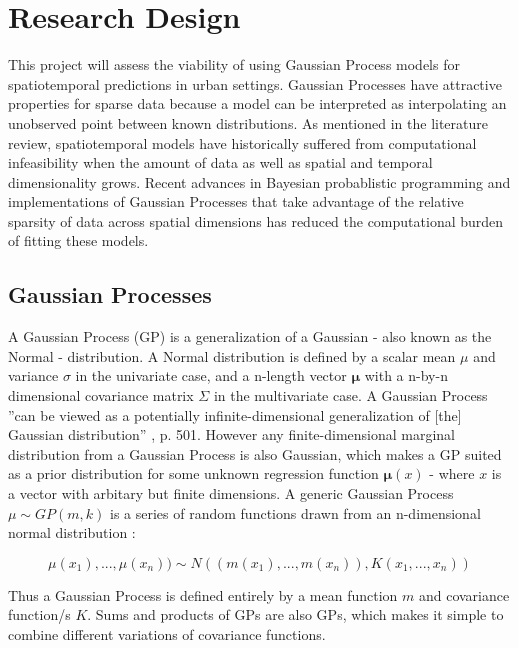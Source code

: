 
\chapter{Research Design}
\label{design}


This project will assess the viability of using Gaussian Process models for spatiotemporal predictions in urban settings. Gaussian Processes have attractive properties for sparse data because a model can be interpreted as interpolating an unobserved point between known distributions. As mentioned in the literature review, spatiotemporal models have historically suffered from computational infeasibility when the amount of data as well as spatial and temporal dimensionality grows. Recent advances in Bayesian probablistic programming and implementations of Gaussian Processes that take advantage of the relative sparsity of data across spatial dimensions has reduced the computational burden of fitting these models. \par


\section{Gaussian Processes}

A Gaussian Process (GP) is a generalization of a Gaussian - also known as the Normal - distribution. A Normal distribution is defined by a scalar mean $\mu$ and variance $\sigma$ in the univariate case, and a n-length vector $\mathbf{\mu}$ with a n-by-n dimensional covariance matrix $\Sigma$ in the multivariate case. A Gaussian Process ''can be viewed as a potentially infinite-dimensional generalization of [the] Gaussian distribution'' \cite{gelman2013bayesian} , p. 501. However any finite-dimensional marginal distribution from a Gaussian Process is also Gaussian, which makes a GP suited as a prior distribution for some unknown regression function $\mathbf{\mu}(x)$ - where $x$ is a vector with arbitary but finite dimensions. A generic Gaussian Process $\mu \sim GP(m,k)$ is a series of random functions drawn from an n-dimensional normal distribution \cite{gelman2013bayesian}: \par

$$ \mu(x_1),...,\mu(x_n)) \sim N((m(x_1),...,m(x_n)),K(x_1,...,x_n)) $$

Thus a Gaussian Process is defined entirely by a mean function $m$ and covariance function/s $K$. Sums and products of GPs are also GPs, which makes it simple to combine different variations of covariance functions.

